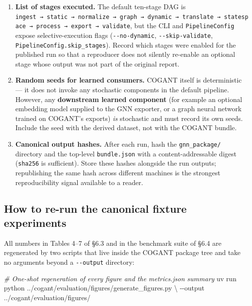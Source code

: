 \documentclass[
]{article}
\newenvironment{Shaded}{}{}
\newcommand{\AttributeTok}[1]{\textcolor[rgb]{0.49,0.56,0.16}{#1}}
\newcommand{\CommentTok}[1]{\textcolor[rgb]{0.38,0.63,0.69}{\textit{#1}}}
\newcommand{\DataTypeTok}[1]{\textcolor[rgb]{0.56,0.13,0.00}{#1}}
\newcommand{\ExtensionTok}[1]{#1}
\newcommand{\NormalTok}[1]{#1}
\begin{document}
\begin{enumerate}
  publication; the config loader in \texttt{../cogant/py/cogant/config/}
  does not automatically strip these.
\item
  \textbf{List of stages executed.} The default ten-stage DAG is
  \texttt{ingest\ →\ static\ →\ normalize\ →\ graph\ →\ dynamic\ →\ translate\ →\ statespace\ →\ process\ →\ export\ →\ validate},
  but the CLI and \texttt{PipelineConfig} expose selective-execution
  flags (\texttt{-\/-no-dynamic}, \texttt{-\/-skip-validate},
  \texttt{PipelineConfig.skip\_stages}). Record which stages were
  enabled for the published run so that a reproducer does not silently
  re-enable an optional stage whose output was not part of the original
  report.
\item
  \textbf{Random seeds for learned consumers.} COGANT itself is
  deterministic --- it does not invoke any stochastic components in the
  default pipeline. However, any \textbf{downstream learned component}
  (for example an optional embedding model supplied to the GNN exporter,
  or a graph neural network trained on COGANT's exports) \emph{is}
  stochastic and must record its own seeds. Include the seed with the
  derived dataset, not with the COGANT bundle.
\item
  \textbf{Canonical output hashes.} After each run, hash the
  \texttt{gnn\_package/} directory and the top-level
  \texttt{bundle.json} with a content-addressable digest
  (\texttt{sha256} is sufficient). Store these hashes alongside the run
  outputs; republishing the same hash across different machines is the
  strongest reproducibility signal available to a reader.
\end{enumerate}

\subsection{How to re-run the canonical fixture
experiments}\label{how-to-re-run-the-canonical-fixture-experiments}

All numbers in Tables 4--7 of §6.3 and in the benchmark suite of §6.4
are regenerated by two scripts that live inside the COGANT package tree
and take no arguments beyond a \texttt{-\/-output} directory:

\begin{Shaded}
\begin{Highlighting}[]
\CommentTok{\# One{-}shot regeneration of every figure and the metrics.json summary}
\ExtensionTok{uv}\NormalTok{ run python ../cogant/evaluation/figures/generate\_figures.py }\DataTypeTok{\textbackslash{}}
    \AttributeTok{{-}{-}output}\NormalTok{ ../cogant/evaluation/figures/}
\end{Highlighting}
\end{Shaded}
\end{document}

